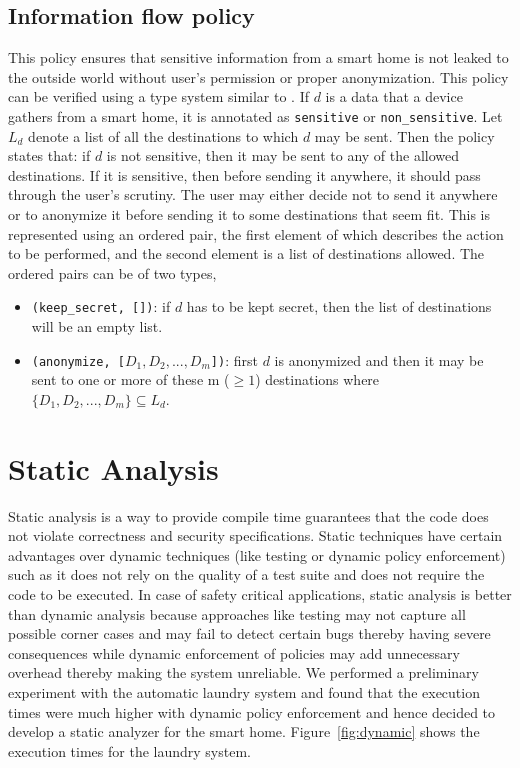 \documentclass{article}
\begin{document}
\subsection{Information flow policy}
\label{subsec:information}
This policy ensures that sensitive information from a smart home is not leaked to the outside world without user's permission or proper anonymization.
This policy can be verified using a type system similar to \cite{ernst}. If $d$ is a data that a device gathers from a smart home, it is annotated as \texttt{sensitive} or \texttt{non\_sensitive}. 
Let $L_d$ denote a list of all the destinations to which $d$ may be sent. Then the policy states that: if $d$ is not sensitive, then it may be sent to any of the allowed destinations. If it is sensitive, then before sending it anywhere, it should pass through the user's scrutiny. The user may either decide not to send it anywhere or to anonymize it before sending it to some destinations that seem fit. This is represented using an ordered pair, the first element of which describes the action to be performed, and the second element is a list of destinations allowed. The ordered pairs can be of two types, \vspace{-7pt}
\begin{itemize}
\itemsep0em 
\item \texttt{(keep\_secret, [])}: if $d$ has to be kept secret, then the list of destinations will be an empty list.
\item \texttt{(anonymize, [$D_1, D_2, ..., D_m$])}: first $d$ is anonymized and then it may be sent to one or more of these m ($\geq1$) destinations where $\{D_1, D_2, ..., D_m\} \subseteq L_d$. 
\end{itemize}

\section{Static Analysis}
\label{sec:analysis}
Static analysis is a way to provide compile time guarantees that the code does not violate correctness and security specifications. Static techniques have certain advantages over dynamic techniques (like testing or dynamic policy enforcement) such as it does not rely on the quality of a test suite and does not require the code to be executed. In case of safety critical applications, static analysis is better than dynamic analysis because approaches like testing may not capture all possible corner cases and may fail to detect certain bugs thereby having severe consequences while dynamic enforcement of policies may add unnecessary overhead thereby making the system unreliable. We performed a preliminary experiment with the automatic laundry system and found that the execution times were much higher with dynamic policy enforcement and hence decided to develop a static analyzer for the smart home. Figure~\ref{fig:dynamic} shows the execution times for the laundry system. 
\end{document}
